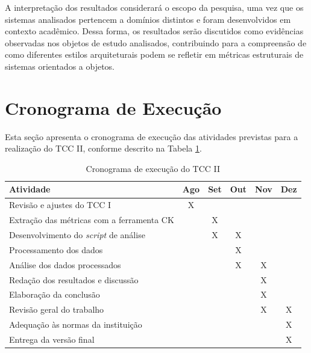 A interpretação dos resultados considerará o escopo da pesquisa, uma vez que os sistemas analisados pertencem a domínios distintos 
e foram desenvolvidos em contexto acadêmico. Dessa forma, os resultados serão discutidos como evidências observadas nos objetos de 
estudo analisados, contribuindo para a compreensão de como diferentes estilos arquiteturais podem se refletir em métricas estruturais 
de sistemas orientados a objetos.

\section{Cronograma de Execução}
\label{sec:cronograma-execucao}

Esta seção apresenta o cronograma de execução das atividades previstas para a realização do TCC II, conforme descrito na Tabela \ref{tab:cronograma}.

\begin{table}[H]
\centering
\caption{Cronograma de execução do TCC II}
\label{tab:cronograma}

\begin{tabular}{|p{7cm}|c|c|c|c|c|}
\hline
\textbf{Atividade} & \textbf{Ago} & \textbf{Set} & \textbf{Out} & \textbf{Nov} & \textbf{Dez} \\ \hline

Revisão e ajustes do TCC I & X & & & & \\ \hline

Extração das métricas com a ferramenta CK & & X & & & \\ \hline

Desenvolvimento do \textit{script} de análise & & X & X & & \\ \hline

Processamento dos dados & & & X & & \\ \hline

Análise dos dados processados & & & X & X & \\ \hline

Redação dos resultados e discussão & & & & X & \\ \hline

Elaboração da conclusão & & & & X & \\ \hline

Revisão geral do trabalho & & & & X & X \\ \hline

Adequação às normas da instituição & & & & & X \\ \hline

Entrega da versão final & & & & & X \\ \hline

\end{tabular}

\vspace{0.1cm}
\par
{}

\end{table}
